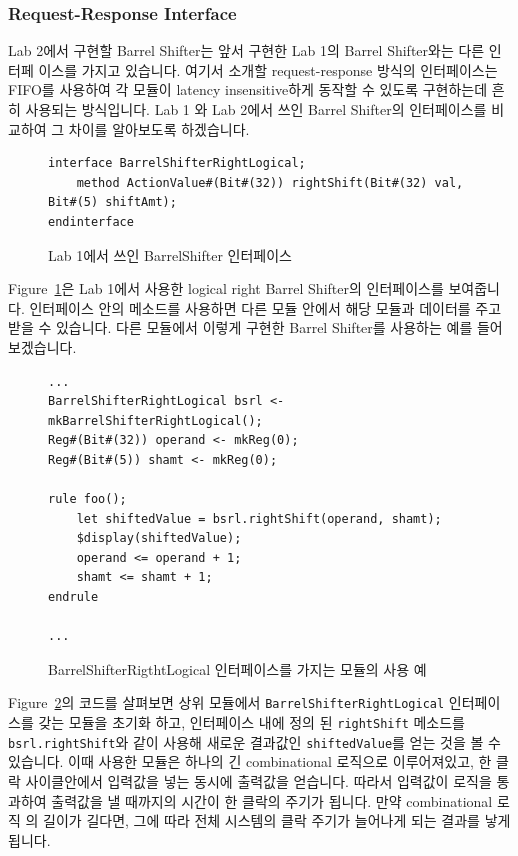 \documentclass{article}
\begin{document}
\subsubsection{Request-Response Interface}
Lab 2에서 구현할 Barrel Shifter는 앞서 구현한 Lab 1의 Barrel Shifter와는 다른 인터페
이스를 가지고 있습니다. 여기서 소개할 request-response 방식의 인터페이스는 FIFO를 사용하여
각 모듈이 latency insensitive하게 동작할 수 있도록 구현하는데 흔히 사용되는 방식입니다. Lab 1
와 Lab 2에서 쓰인 Barrel Shifter의 인터페이스를 비교하여 그 차이를 알아보도록 하겠습니다.

\begin{figure}[!ht]
\centering
\begin{Verbatim}[frame=single]
interface BarrelShifterRightLogical;
	method ActionValue#(Bit#(32)) rightShift(Bit#(32) val, Bit#(5) shiftAmt);
endinterface
\end{Verbatim}
\caption{Lab 1에서 쓰인 BarrelShifter 인터페이스}
\label{fig:brs_interface}
\end{figure}

Figure~\ref{fig:brs_interface}은 Lab 1에서 사용한 logical right Barrel Shifter의 인터페이스를 보여줍니다. 
인터페이스 안의 메소드를 사용하면 다른 모듈 안에서 해당 모듈과 데이터를 주고 받을 수 있습니다. 
다른 모듈에서 이렇게 구현한 Barrel Shifter를 사용하는 예를 들어보겠습니다.

\begin{figure}[!ht]
	\centering
\begin{Verbatim}[frame=single]
...
BarrelShifterRightLogical bsrl <- mkBarrelShifterRightLogical();
Reg#(Bit#(32)) operand <- mkReg(0);
Reg#(Bit#(5)) shamt <- mkReg(0);

rule foo();
	let shiftedValue = bsrl.rightShift(operand, shamt);
	$display(shiftedValue);
	operand <= operand + 1;
	shamt <= shamt + 1;
endrule

...
\end{Verbatim}
	\caption{BarrelShifterRigthtLogical 인터페이스를 가지는 모듈의 사용 예}
	\label{fig:brs_usage}
\end{figure}

Figure~\ref{fig:brs_usage}의 코드를 살펴보면 상위 모듈에서 \texttt{BarrelShifterRightLogical} 인터페이스를 갖는 모듈을 
초기화 하고, 인터페이스 내에 정의 된 \texttt{rightShift} 메소드를 \texttt{bsrl.rightShift}와 같이 사용해 새로운 결과값인
\texttt{shiftedValue}를 얻는 것을 볼 수 있습니다. 이때 사용한 모듈은 하나의 긴 combinational 로직으로
이루어져있고, 한 클락 사이클안에서 입력값을 넣는 동시에 출력값을 얻습니다. 따라서 입력값이
로직을 통과하여 출력값을 낼 때까지의 시간이 한 클락의 주기가 됩니다. 만약 combinational 로직
의 길이가 길다면, 그에 따라 전체 시스템의 클락 주기가 늘어나게 되는 결과를 낳게됩니다.
\end{document}
